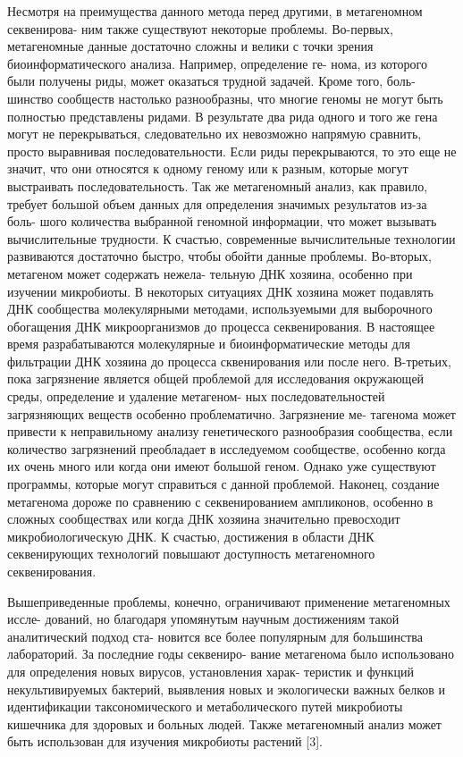 Несмотря на преимущества данного метода перед другими, в метагеномном секвенирова-
ним также существуют некоторые проблемы. Во-первых, метагеномные данные достаточно
сложны и велики с точки зрения биоинформатического анализа. Например, определение ге-
нома, из которого были получены риды, может оказаться трудной задачей. Кроме того, боль-
шинство сообществ настолько разнообразны, что многие геномы не могут быть полностью
представлены ридами. В результате два рида одного и того же гена могут не перекрываться,
следовательно их невозможно напрямую сравнить, просто выравнивая последовательности.
Если риды перекрываются, то это еще не значит, что они относятся к одному геному или к
разным, которые могут выстраивать последовательность. Так же метагеномный анализ, как
правило, требует большой объем данных для определения значимых результатов из-за боль-
шого количества выбранной геномной информации, что может вызывать вычислительные
трудности. К счастью, современные вычислительные технологии развиваются достаточно
быстро, чтобы обойти данные проблемы. Во-вторых, метагеном может содержать нежела-
тельную ДНК хозяина, особенно при изучении микробиоты. В некоторых ситуациях ДНК
хозяина может подавлять ДНК сообщества молекулярными методами, используемыми для
выборочного обогащения ДНК микроорганизмов до процесса секвенирования. В настоящее
время разрабатываются молекулярные и биоинформатические методы для фильтрации ДНК
хозяина до процесса сквенирования или после него. В-третьих, пока загрязнение является
общей проблемой для исследования окружающей среды, определение и удаление метагеном-
ных последовательностей загрязняющих веществ особенно проблематично. Загрязнение ме-
тагенома может привести к неправильному анализу генетического разнообразия сообщества,
если количество загрязнений преобладает в исследуемом сообществе, особенно когда их очень
много или когда они имеют большой геном. Однако уже существуют программы, которые
могут справиться с данной проблемой. Наконец, создание метагенома дороже по сравнению
с секвенированием ампликонов, особенно в сложных сообществах или когда ДНК хозяина
значительно превосходит микробиологическую ДНК. К счастью, достижения в области ДНК
секвенирующих технологий повышают доступность метагеномного секвенирования.

Вышеприведенные проблемы, конечно, ограничивают применение метагеномных иссле-
дований, но благодаря упомянутым научным достижениям такой аналитический подход ста-
новится все более популярным для большинства лабораторий. За последние годы секвениро-
вание метагенома было использовано для определения новых вирусов, установления харак-
теристик и функций некультивируемых бактерий, выявления новых и экологически важных
белков и идентификации таксономического и метаболического путей микробиоты кишечника
для здоровых и больных людей. Также метагеномный анализ может быть использован для
изучения микробиоты растений [3].

